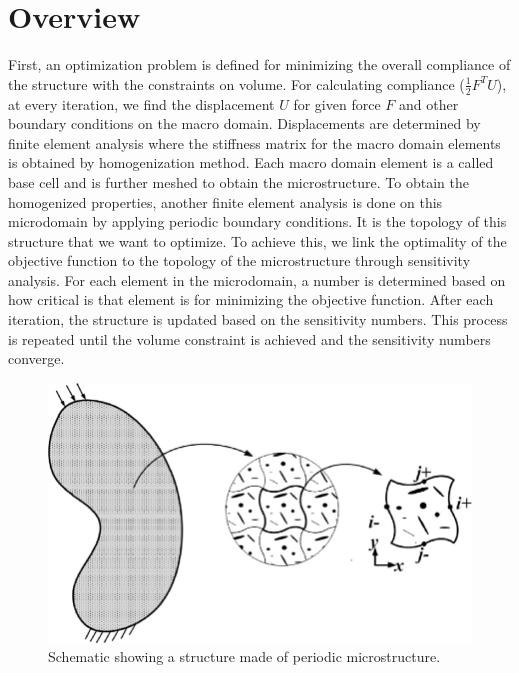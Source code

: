 \documentclass[openright,twoside]{iitkthesis}
\begin{document}
\section{Overview}
First, an optimization problem is defined for minimizing the overall compliance of the structure with the constraints on volume. For calculating compliance ($\frac{1}{2}F^TU$), at every iteration, we find the displacement $U$ for given force $F$ and other boundary conditions on the macro domain. Displacements are determined by finite element analysis where the stiffness matrix for the macro domain elements is obtained by homogenization method. Each macro domain element is a called base cell and is further meshed to obtain the microstructure. To obtain the homogenized properties, another finite element analysis is done on this microdomain by applying periodic boundary conditions. It is the topology of this structure that we want to optimize. To achieve this, we link the optimality of the objective function to the topology of the microstructure through sensitivity analysis. For each element in the microdomain, a number is determined based on how critical is that element is for minimizing the objective function. After each iteration, the structure is updated based on the sensitivity numbers. This process is repeated until the volume constraint is achieved and the sensitivity numbers converge.
\begin{figure}[H]
\begin{center}
\includegraphics[scale=0.28]{./Plots/opti/microstructure.png}
\caption{Schematic showing a structure made of periodic microstructure.}
\label{fig:cantilever}
\end{center}
\end{figure}
\end{document}

